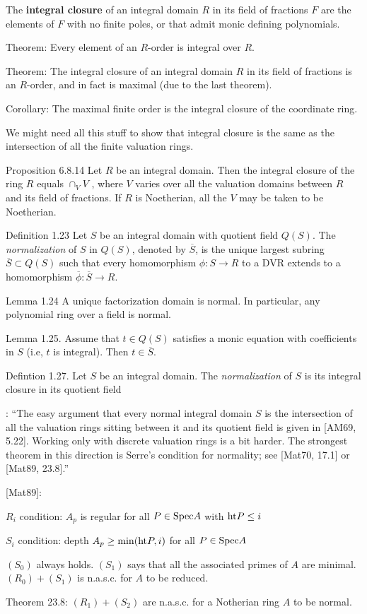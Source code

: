 \begin{definition}
The {\bf integral closure} of an integral domain $R$ in its field of fractions $F$
are the elements of $F$ with no finite poles, or that admit monic defining polynomials.
\end{definition}

Theorem: Every element of an $R$-order is integral over $R$.

Theorem: The integral closure of an integral domain $R$ in its field of fractions is an $R$-order,
and in fact is maximal (due to the last theorem).

Corollary: The maximal finite order is the integral closure of the coordinate ring.

\begin{mdframed}[backgroundcolor=yellow!20]
We might need all this stuff to show that integral closure is the same as the intersection
of all the finite valuation rings.

\cite{Swanson Huneke} Proposition 6.8.14 Let $R$ be an integral domain. Then
the integral closure of the ring $R$ equals $\cap_V V$ , where $V$
varies over all the valuation domains between $R$ and its field of
fractions. If $R$ is Noetherian, all the $V$ may be taken to be
Noetherian.

\cite{kollar} Definition 1.23
Let $S$ be an integral domain with quotient field $Q(S)$.
The {\it normalization} of $S$ in $Q(S)$, denoted by $\overline{S}$,
is the unique largest subring $\overline{S} \subset Q(S)$
such that every homomorphism $\phi: S \to R$ to a DVR
extends to a homomorphism $\overline{\phi}: \overline{S} \to R$.

\cite{kollar} Lemma 1.24
A unique factorization domain is normal.  In particular,
any polynomial ring over a field is normal.

\cite{kollar} Lemma 1.25.
Assume that $t \in Q(S)$ satisfies a monic equation
with coefficients in $S$ (i.e, $t$ is integral).
Then $t \in \overline{S}$.

\cite{kollar} Defintion 1.27.
Let $S$ be an integral domain.  The {\it normalization} of $S$
is its integral closure in its quotient field

\cite{kollar}: ``The easy argument that every normal integral domain $S$
is the intersection of all the valuation rings sitting between
it and its quotient field is given in [AM69, 5.22].  Working
only with discrete valuation rings is a bit harder.  The strongest
theorem in this direction is Serre's condition for normality;
see [Mat70, 17.1] or [Mat89, 23.8].''

[Mat89]:

$R_i$ condition: $A_p$ is regular for all $P \in {\rm Spec } A$ with ${\rm ht } P \le i$

$S_i$ condition: depth $A_p \ge {\rm min}({\rm ht } P, i)$ for all $P \in {\rm Spec } A$

$(S_0)$ always holds. $(S_1)$ says that all the associated primes of $A$ are minimal.
$(R_0)+(S_1)$ is n.a.s.c. for $A$ to be reduced.

Theorem 23.8: $(R_1)+(S_2)$ are n.a.s.c. for a Notherian ring $A$ to be normal.
\end{mdframed}

